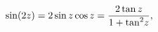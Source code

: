 \[\mathop{\sin\/}\nolimits\!\left(2z\right)=2\mathop{\sin\/}\nolimits z\mathop{%
\cos\/}\nolimits z=\frac{2\mathop{\tan\/}\nolimits z}{1+{\mathop{\tan\/}%
\nolimits^{2}}z},\]